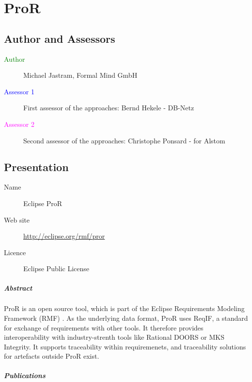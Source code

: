 \chapter{ProR}
\label{sec:pror}

\section{Author and Assessors}

\begin{description}
\item[\textcolor{green}{Author}] Michael Jastram, Formal Mind GmbH
\item[\textcolor{blue}{Assessor 1}] First assessor of the approaches: Bernd Hekele - DB-Netz
\item[\textcolor{magenta}{Assessor 2}] Second assessor of the approaches: Christophe Ponsard - for Alstom
\end{description}

\section{Presentation}

\begin{description}
\item[Name] Eclipse ProR
\item[Web site] \url{http://eclipse.org/rmf/pror}
\item[Licence] Eclipse Public License
\end{description}

\paragraph{Abstract}

ProR is an open source tool, which is part of the Eclipse Requirements Modeling Framework (RMF) \cite{RMF}.  As the underlying data format, ProR uses ReqIF, a standard for exchange of requirements with other tools.  It therefore provides interoperability with industry-strenth tools like Rational DOORS or MKS Integrity.  It supports traceability within requiremenets, and traceability solutions for artefacts outside ProR exist.

\paragraph{Publications}

